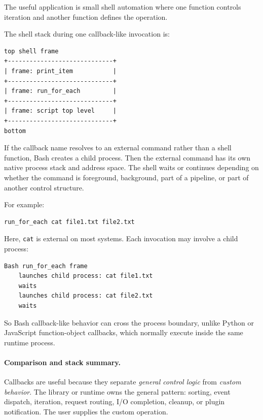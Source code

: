 \documentclass[a4paper,twoside]{report}
\begin{document}
The useful application is small shell automation where one function controls iteration and another function defines the operation.

The shell stack during one callback-like invocation is:

\begin{verbatim}
top shell frame
+-----------------------------+
| frame: print_item           |
+-----------------------------+
| frame: run_for_each         |
+-----------------------------+
| frame: script top level     |
+-----------------------------+
bottom
\end{verbatim}

If the callback name resolves to an external command rather than a shell function, Bash creates a child process. Then the external command has its own native process stack and address space. The shell waits or continues depending on whether the command is foreground, background, part of a pipeline, or part of another control structure.

For example:

\begin{verbatim}
run_for_each cat file1.txt file2.txt
\end{verbatim}

Here, \texttt{cat} is external on most systems. Each invocation may involve a child process:

\begin{verbatim}
Bash run_for_each frame
    launches child process: cat file1.txt
    waits
    launches child process: cat file2.txt
    waits
\end{verbatim}

So Bash callback-like behavior can cross the process boundary, unlike Python or JavaScript function-object callbacks, which normally execute inside the same runtime process.

\paragraph{Comparison and stack summary.}

Callbacks are useful because they separate \emph{general control logic} from \emph{custom behavior}. The library or runtime owns the general pattern: sorting, event dispatch, iteration, request routing, I/O completion, cleanup, or plugin notification. The user supplies the custom operation.
\end{document}
